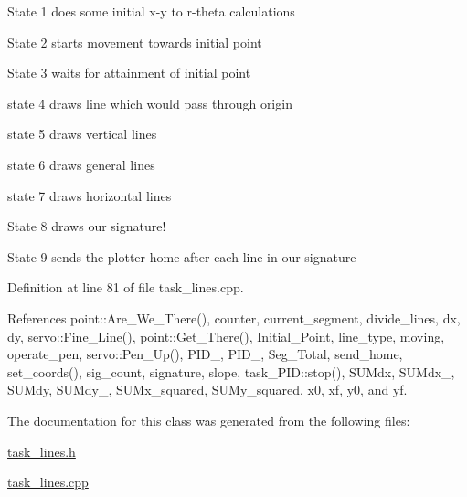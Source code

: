 State 1 does some initial x-\/y to r-\/theta calculations

State 2 starts movement towards initial point

State 3 waits for attainment of initial point

state 4 draws line which would pass through origin

state 5 draws vertical lines

state 6 draws general lines

state 7 draws horizontal lines

State 8 draws our signature!

State 9 sends the plotter home after each line in our signature 

Definition at line 81 of file task\-\_\-lines.\-cpp.



References point\-::\-Are\-\_\-\-We\-\_\-\-There(), counter, current\-\_\-segment, divide\-\_\-lines, dx, dy, servo\-::\-Fine\-\_\-\-Line(), point\-::\-Get\-\_\-\-There(), Initial\-\_\-\-Point, line\-\_\-type, moving, operate\-\_\-pen, servo\-::\-Pen\-\_\-\-Up(), P\-I\-D\-\_, P\-I\-D\-\_, Seg\-\_\-\-Total, send\-\_\-home, set\-\_\-coords(), sig\-\_\-count, signature, slope, task\-\_\-\-P\-I\-D\-::stop(), S\-U\-Mdx, S\-U\-Mdx\-\_, S\-U\-Mdy, S\-U\-Mdy\-\_, S\-U\-Mx\-\_\-squared, S\-U\-My\-\_\-squared, x0, xf, y0, and yf.



The documentation for this class was generated from the following files\-:\begin{DoxyCompactItemize}
\item 
\hyperlink{task__lines_8h}{task\-\_\-lines.\-h}\item 
\hyperlink{task__lines_8cpp}{task\-\_\-lines.\-cpp}\end{DoxyCompactItemize}
